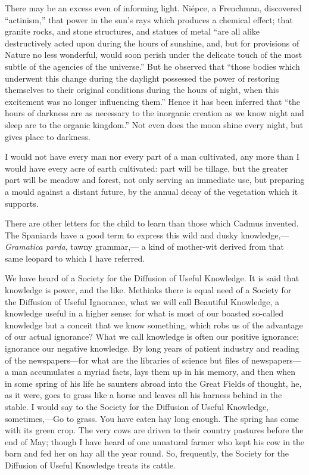 \documentclass[twoside,openright,10pt]{memoir} %
\begin{document}
There may be an excess even of informing light. Niépce, a Frenchman, discovered “actinism,” that power in the sun’s rays which produces a chemical effect; that granite rocks, and stone structures, and statues of metal “are all alike destructively acted upon during the hours of sunshine, and, but for provisions of Nature no less wonderful, would soon perish under the delicate touch of the most subtle of the agencies of the universe.” But he observed that “those bodies which underwent this change during the daylight possessed the power of restoring themselves to their original conditions during the hours of night, when this excitement was no longer influencing them.” Hence it has been inferred that “the hours of darkness are as necessary to the inorganic creation as we know night and sleep are to the organic kingdom.” Not even does the moon shine every night, but gives place to darkness.

I would not have every man nor every part of a man cultivated, any more than I would have every acre of earth cultivated: part will be tillage, but the greater part will be meadow and forest, not only serving an immediate use, but preparing a mould against a distant future, by the annual decay of the vegetation which it supports.

There are other letters for the child to learn than those which Cadmus invented. The Spaniards have a good term to express this wild and dusky knowledge,—\emph{Gramatica parda}, tawny grammar,— a kind of mother-wit derived from that same leopard to which I have referred.

We have heard of a Society for the Diffusion of Useful Knowledge. It is said that knowledge is power, and the like. Methinks there is equal need of a Society for the Diffusion of Useful Ignorance, what we will call Beautiful Knowledge, a knowledge useful in a higher sense: for what is most of our boasted so-called knowledge but a conceit that we know something, which robs us of the advantage of our actual ignorance? What we call knowledge is often our positive ignorance; ignorance our negative knowledge. By long years of patient industry and reading of the newspapers—for what are the libraries of science but files of newspapers—a man accumulates a myriad facts, lays them up in his memory, and then when in some spring of his life he saunters abroad into the Great Fields of thought, he, as it were, goes to grass like a horse and leaves all his harness behind in the stable. I would say to the Society for the Diffusion of Useful Knowledge, sometimes,—Go to grass. You have eaten hay long enough. The spring has come with its green crop. The very cows are driven to their country pastures before the end of May; though I have heard of one unnatural farmer who kept his cow in the barn and fed her on hay all the year round. So, frequently, the Society for the Diffusion of Useful Knowledge treats its cattle.
\end{document}
